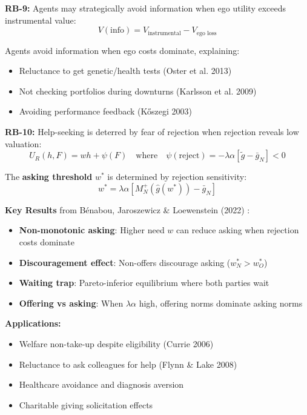 \begin{axiom}
\label{ax:rb-9}
\textbf{RB-9:} Agents may strategically avoid information when ego utility exceeds instrumental value:
\begin{equation}
V(\text{info}) = V_{\text{instrumental}} - V_{\text{ego loss}}
\end{equation}

Agents avoid information when ego costs dominate, explaining:
\begin{itemize}
    \item Reluctance to get genetic/health tests (Oster et al. 2013)
    \item Not checking portfolios during downturns (Karlsson et al. 2009)
    \item Avoiding performance feedback (Kőszegi 2003)
\end{itemize}
\end{axiom}

\begin{axiom}
\label{ax:rb-10}
\textbf{RB-10:} Help-seeking is deterred by fear of rejection when rejection reveals low valuation:
\begin{equation}
U_R(h, F) = wh + \psi(F) \quad \text{where} \quad \psi(\text{reject}) = -\lambda\alpha[\tilde{g} - \bar{g}_N] < 0
\end{equation}

The \textbf{asking threshold} $w^*$ is determined by rejection sensitivity:
\begin{equation}
w^* = \lambda\alpha[M^+_N(\hat{g}(w^*)) - \bar{g}_N]
\end{equation}

\textbf{Key Results} from Bénabou, Jaroszewicz \& Loewenstein (2022) \citep{benabou_2022_hurts_ask}:
\begin{itemize}
    \item \textbf{Non-monotonic asking}: Higher need $w$ can reduce asking when rejection costs dominate
    \item \textbf{Discouragement effect}: Non-offers discourage asking ($w^*_N > w^*_O$)
    \item \textbf{Waiting trap}: Pareto-inferior equilibrium where both parties wait
    \item \textbf{Offering vs asking}: When $\lambda\alpha$ high, offering norms dominate asking norms
\end{itemize}

\textbf{Applications:}
\begin{itemize}
    \item Welfare non-take-up despite eligibility (Currie 2006)
    \item Reluctance to ask colleagues for help (Flynn \& Lake 2008)
    \item Healthcare avoidance and diagnosis aversion
    \item Charitable giving solicitation effects
\end{itemize}
\end{axiom}

